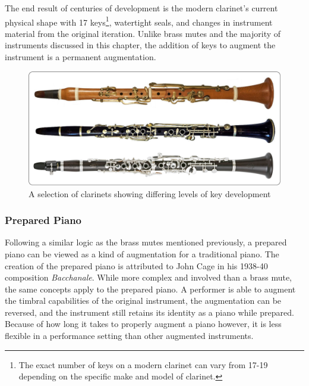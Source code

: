 The end result of centuries of development is the modern clarinet's current physical shape with 17 keys\footnote{The exact number of keys on a modern clarinet can vary from 17-19 depending on the specific make and model of clarinet.}, watertight seals, and changes in instrument material from the original iteration. Unlike brass mutes and the majority of instruments discussed in this chapter, the addition of keys to augment the instrument is a permanent augmentation. 

\begin{figure}
    \centering
    \includegraphics[scale=0.07]{diagrams/M-A-O-clarinets.jpg}
    \caption{A selection of clarinets showing differing levels of key development}
    \label{fig:clKeys} %
\end{figure}

\subsubsection{Prepared Piano}

Following a similar logic as the brass mutes mentioned previously, a prepared piano can be viewed as a kind of augmentation for a traditional piano. The creation of the prepared piano is attributed to John Cage in his 1938-40 composition \textit{Bacchanale}. While more complex and involved than a brass mute, the same concepts apply to the prepared piano. A performer is able to augment the timbral capabilities of the original instrument, the augmentation can be reversed, and the instrument still retains its identity as a piano while prepared. Because of how long it takes to properly augment a piano however, it is less flexible in a performance setting than other augmented instruments. 

